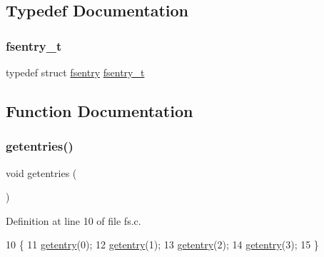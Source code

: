 \subsection{Typedef Documentation}
\mbox{\label{a00128_a9ccf6560e8aebea3e4402a31e8c0f46b_a9ccf6560e8aebea3e4402a31e8c0f46b}} 
\subsubsection{\texorpdfstring{fsentry\+\_\+t}{fsentry\_t}}
{\footnotesize\ttfamily typedef struct \hyperlink{a00226}{fsentry}  \hyperlink{a00128_a9ccf6560e8aebea3e4402a31e8c0f46b_a9ccf6560e8aebea3e4402a31e8c0f46b}{fsentry\+\_\+t}}



\subsection{Function Documentation}
\mbox{\label{a00128_a414110036132977c34813673360e1a63_a414110036132977c34813673360e1a63}} 
\subsubsection{\texorpdfstring{getentries()}{getentries()}}
{\footnotesize\ttfamily void getentries (\begin{DoxyParamCaption}{ }\end{DoxyParamCaption})}



Definition at line 10 of file fs.\+c.


\begin{DoxyCode}
10                   \{
11     \hyperlink{a00125_a3fb32d07d3bd05144a196c94fc59c0d1_a3fb32d07d3bd05144a196c94fc59c0d1}{getentry}(0);
12     \hyperlink{a00125_a3fb32d07d3bd05144a196c94fc59c0d1_a3fb32d07d3bd05144a196c94fc59c0d1}{getentry}(1);
13     \hyperlink{a00125_a3fb32d07d3bd05144a196c94fc59c0d1_a3fb32d07d3bd05144a196c94fc59c0d1}{getentry}(2);
14     \hyperlink{a00125_a3fb32d07d3bd05144a196c94fc59c0d1_a3fb32d07d3bd05144a196c94fc59c0d1}{getentry}(3);
15 \}
\end{DoxyCode}
\mbox{\label{a00128_a3fb32d07d3bd05144a196c94fc59c0d1_a3fb32d07d3bd05144a196c94fc59c0d1}} 
